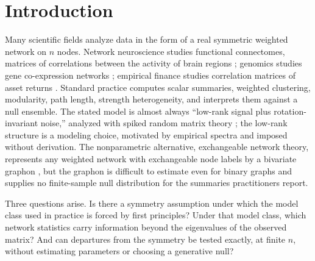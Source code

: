 \section{Introduction}\label{sec:intro}

Many scientific fields analyze data in the form of a real symmetric
weighted network on $n$ nodes. Network neuroscience studies functional
connectomes, matrices of correlations between the activity of brain
regions \citep{bullmore2009complex,rubinov2010complex}; genomics studies
gene co-expression networks \citep{zhang2005general}; empirical finance
studies correlation matrices of asset returns
\citep{laloux1999noise,plerou2002random}. Standard practice computes scalar summaries, weighted clustering,
modularity, path length, strength heterogeneity, and interprets them
against a null ensemble. The stated model is almost always ``low-rank
signal plus rotation-invariant noise,'' analyzed with spiked random
matrix theory
\citep{johnstone2001distribution,baik2005phase,benaych2011eigenvalues};
the low-rank structure is a modeling choice, motivated by empirical
spectra and imposed without derivation. The nonparametric alternative,
exchangeable network theory, represents any weighted network with
exchangeable node labels by a bivariate graphon
\citep{aldous1981representations,hoover1979relations}, but the graphon
is difficult to estimate even for binary graphs
\citep{wolfe2013nonparametric,gao2015rate,klopp2017oracle} and supplies
no finite-sample null distribution for the summaries practitioners
report.

Three questions arise. Is there a symmetry assumption
under which the model class used in practice is forced by first
principles? Under that model class, which network statistics carry
information beyond the eigenvalues of the observed matrix? And can
departures from the symmetry be tested exactly, at finite $n$, without
estimating parameters or choosing a generative null?

